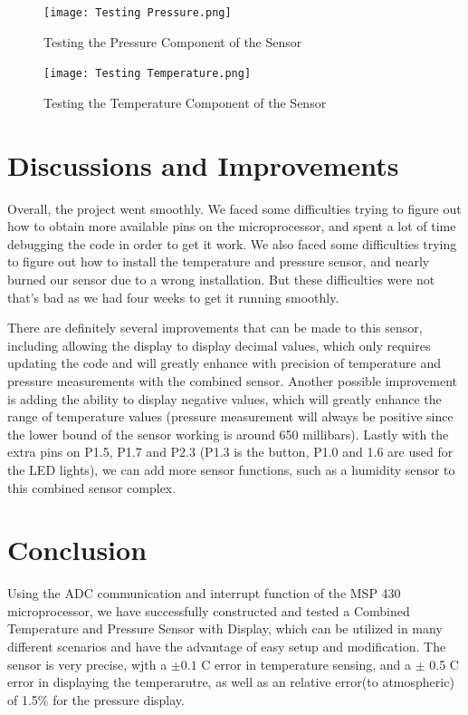 \documentclass{article}
\begin{document}
\begin{figure}[h]
    \centering
    \texttt{[image: Testing Pressure.png]}
    \caption{Testing the Pressure Component of the Sensor}
\end{figure} 

\begin{figure}[h]
    \centering
    \texttt{[image: Testing Temperature.png]}
    \caption{Testing the Temperature Component of the Sensor}
\end{figure} 



\section{Discussions and Improvements}
Overall, the project went smoothly. We faced some difficulties trying to figure out how to obtain more available pins on the microprocessor, and spent a lot of time debugging the code in order to get it work. We also faced some difficulties trying to figure out how to install the temperature and pressure sensor, and nearly burned our sensor due to a wrong installation. But these difficulties were not that's  bad as we had four weeks to get it running smoothly. 

There are definitely several improvements that can be made to this sensor, including allowing the display to display decimal values, which only requires updating the code and will greatly enhance with precision of temperature and pressure measurements with the combined sensor.  Another possible improvement is adding the ability to display negative values, which will greatly enhance the range of temperature values (pressure measurement will always be positive since the lower bound of the sensor working is around 650 millibars). Lastly with the extra pins on P1.5, P1.7 and P2.3 (P1.3 is the button, P1.0 and 1.6 are used for the LED lights), we can add more sensor functions, such as a humidity sensor to this combined sensor complex. 


\section{Conclusion} 
Using the ADC communication and interrupt function of the MSP 430 microprocessor, we have successfully constructed and tested a Combined Temperature and Pressure Sensor with Display, which can be utilized in many different scenarios and have the advantage of easy setup and modification. The sensor is very precise, wjth a $\pm 0.1$ \textdegree C error in temperature sensing, and a $\pm$ 0.5 \textdegree C error in displaying the temperarutre, as well as an relative error(to atmospheric) of 1.5$\%$ for the pressure display. 
\end{document}
